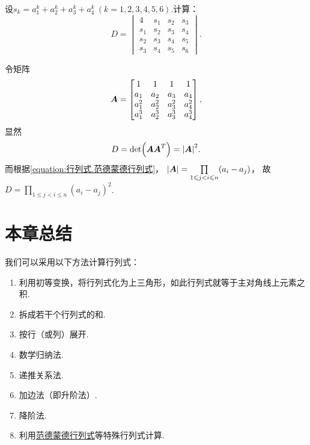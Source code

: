 \begin{example}
设\(s_k = a_1^k + a_2^k + a_3^k + a_4^k\ (k=1,2,3,4,5,6)\).计算：\[
D = \begin{vmatrix}
4 & s_1 & s_2 & s_3 \\
s_1 & s_2 & s_3 & s_4 \\
s_2 & s_3 & s_4 & s_5 \\
s_3 & s_4 & s_5 & s_6
\end{vmatrix}.
\]
\begin{solution}
令矩阵\[
\boldsymbol{A} = \begin{bmatrix}
1 & 1 & 1 & 1 \\
a_1 & a_2 & a_3 & a_4 \\
a_1^2 & a_2^2 & a_3^2 & a_4^2 \\
a_1^3 & a_2^3 & a_3^3 & a_4^3
\end{bmatrix},
\]显然\[
D = \det(\boldsymbol{A}\boldsymbol{A}^T) = \abs{\boldsymbol{A}}^2.
\]
而根据\cref{equation:行列式.范德蒙德行列式}，
\(\abs{\boldsymbol{A}}
= \prod\limits_{1 \leqslant j < i \leqslant n} (a_i - a_j)\)，
故\(D = \prod\limits_{1 \leqslant j < i \leqslant n} (a_i - a_j)^2\).
\end{solution}
\end{example}

\section{本章总结}
我们可以采用以下方法计算行列式：
\begin{enumerate}
	\item 利用初等变换，将行列式化为上三角形，如此行列式就等于主对角线上元素之积.
	\item 拆成若干个行列式的和.
	\item 按行（或列）展开.
	\item 数学归纳法.
	\item 递推关系法.
	\item 加边法（即升阶法）.
	\item 降阶法.
	\item 利用\hyperref[equation:行列式.范德蒙德行列式]{范德蒙德行列式}等特殊行列式计算.
\end{enumerate}
